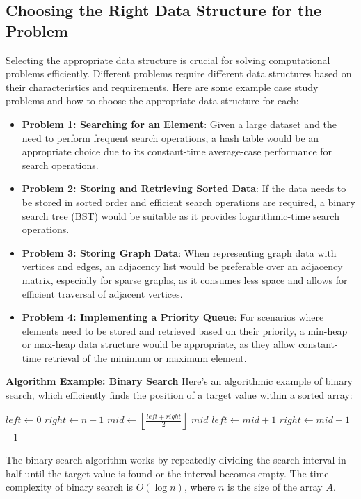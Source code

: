 \documentclass[12pt]{book} %
\begin{document}
\subsection{Choosing the Right Data Structure for the Problem}
Selecting the appropriate data structure is crucial for solving computational problems efficiently. Different problems require different data structures based on their characteristics and requirements. Here are some example case study problems and how to choose the appropriate data structure for each:

\begin{itemize}
    \item \textbf{Problem 1: Searching for an Element}: Given a large dataset and the need to perform frequent search operations, a hash table would be an appropriate choice due to its constant-time average-case performance for search operations.
    \item \textbf{Problem 2: Storing and Retrieving Sorted Data}: If the data needs to be stored in sorted order and efficient search operations are required, a binary search tree (BST) would be suitable as it provides logarithmic-time search operations.
    \item \textbf{Problem 3: Storing Graph Data}: When representing graph data with vertices and edges, an adjacency list would be preferable over an adjacency matrix, especially for sparse graphs, as it consumes less space and allows for efficient traversal of adjacent vertices.
    \item \textbf{Problem 4: Implementing a Priority Queue}: For scenarios where elements need to be stored and retrieved based on their priority, a min-heap or max-heap data structure would be appropriate, as they allow constant-time retrieval of the minimum or maximum element.
\end{itemize}

\FloatBarrier
\textbf{Algorithm Example: Binary Search}
Here's an algorithmic example of binary search, which efficiently finds the position of a target value within a sorted array:
\FloatBarrier
\begin{algorithm}[H]
\caption{Binary Search}
\begin{algorithmic}[1]
    \State $left \gets 0$
    \State $right \gets n - 1$
        \State $mid \gets \left\lfloor \frac{left + right}{2} \right\rfloor$
            \State \Return $mid$ 
            \State $left \gets mid + 1$
        \Else
            \State $right \gets mid - 1$
        \EndIf
    \EndWhile
    \State \Return $-1$ 
\EndProcedure
\end{algorithmic}
\end{algorithm}
\FloatBarrier
The binary search algorithm works by repeatedly dividing the search interval in half until the target value is found or the interval becomes empty. The time complexity of binary search is $O(\log n)$, where $n$ is the size of the array $A$.
\end{document}
